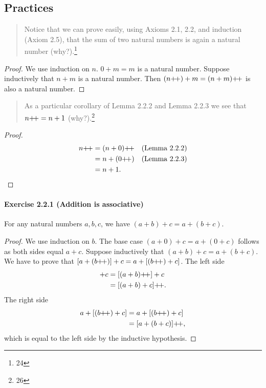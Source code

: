 \subsection{Practices}
\begin{quote}
    Notice that we can prove easily, using Axioms 2.1, 2.2, and induction (Axiom 2.5), that the sum of two natural numbers is again a natural number (why?).\footnote{24}
\end{quote}
\begin{proof}
    We use induction on $n$. $0+m=m$ is a natural number. Suppose inductively that $n+m$ is a natural number. Then $(n{+}{\mkern-3mu}{+}) + m = (n+m){+}{\mkern-3mu}{+}$ is also a natural number. 
\end{proof}

\begin{quote}
    As a particular corollary of Lemma 2.2.2 and Lemma 2.2.3 we see that $n{+}{\mkern-3mu}{+} = n + 1$ (why?).\footnote{26}
\end{quote}
\begin{proof}
    \begin{align*}
        n{+}{\mkern-3mu}{+} &= (n+0){+}{\mkern-3mu}{+} && \text{(Lemma 2.2.2)}\\
        &=n + (0{+}{\mkern-3mu}{+}) && \text{(Lemma 2.2.3)}\\
        &=n + 1. &&\qedhere
    \end{align*}
\end{proof}

\paragraph{Exercise 2.2.1 (Addition is associative)} For any natural numbers $a,b,c$, we have $(a+b)+c=a+(b+c)$.
\begin{proof}
    We use induction on $b$. The base case $(a+0)+c=a+(0+c)$ follows as both sides equal $a+c$. Suppose inductively that $(a+b)+c=a+(b+c)$. We have to prove that $[a+(b{+}{\mkern-3mu}{+})]+c=a+[(b{+}{\mkern-3mu}{+})+c]$. The left side 
\begin{align*}
    [a+(b\inc)]+c&= [(a+b)\inc]+c\\
    &= [(a+b)+c]\inc.
\end{align*}
The right side
\begin{align*}
    a+[(b{+}{\mkern-3mu}{+})+c]&= a+[(b{+}{\mkern-3mu}{+})+c]\\
    &= [a+(b+c)]{+}{\mkern-3mu}{+},
\end{align*}
    which is equal to the left side by the inductive hypothesis.
\end{proof}

